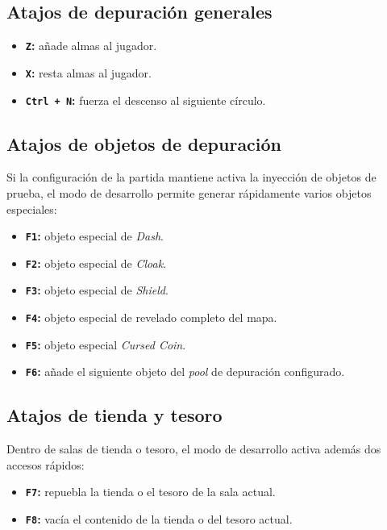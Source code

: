 \subsection{Atajos de depuración generales}
\begin{itemize}
    \item \textbf{\texttt{Z}:} añade almas al jugador.
    \item \textbf{\texttt{X}:} resta almas al jugador.
    \item \textbf{\texttt{Ctrl + N}:} fuerza el descenso al siguiente círculo.
\end{itemize}

\subsection{Atajos de objetos de depuración}
Si la configuración de la partida mantiene activa la inyección de objetos de prueba, el modo
de desarrollo permite generar rápidamente varios objetos especiales:

\begin{itemize}
    \item \textbf{\texttt{F1}:} objeto especial de \textit{Dash}.
    \item \textbf{\texttt{F2}:} objeto especial de \textit{Cloak}.
    \item \textbf{\texttt{F3}:} objeto especial de \textit{Shield}.
    \item \textbf{\texttt{F4}:} objeto especial de revelado completo del mapa.
    \item \textbf{\texttt{F5}:} objeto especial \textit{Cursed Coin}.
    \item \textbf{\texttt{F6}:} añade el siguiente objeto del \textit{pool} de depuración configurado.
\end{itemize}

\subsection{Atajos de tienda y tesoro}
Dentro de salas de tienda o tesoro, el modo de desarrollo activa además dos accesos rápidos:

\begin{itemize}
    \item \textbf{\texttt{F7}:} repuebla la tienda o el tesoro de la sala actual.
    \item \textbf{\texttt{F8}:} vacía el contenido de la tienda o del tesoro actual.
\end{itemize}

